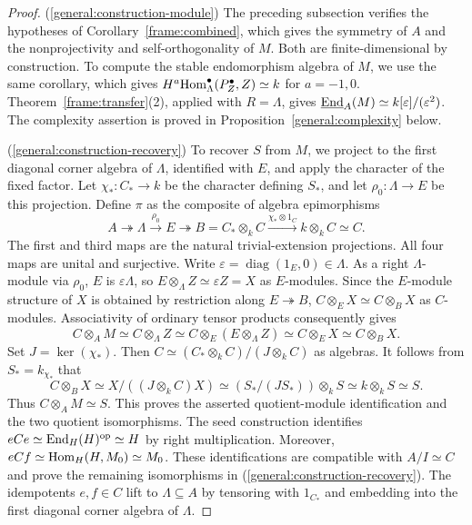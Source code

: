 \documentclass[11pt]{article}
\begin{document}
\begin{proof}
\textup{(\ref{general:construction-module})} The preceding subsection verifies the hypotheses of
Corollary~\ref{frame:combined}, which gives the symmetry of $A$
and the nonprojectivity and self-orthogonality of $M$.
Both are finite-dimensional by construction.
To compute the stable endomorphism algebra of $M$, we use the
same corollary, which gives
$H^a{\rm Hom}_\Lambda^\bullet(P_Z^\bullet,Z)\simeq k$ for $a=-1,0$.
Theorem~\ref{frame:transfer}\textup{(2)}, applied with $R=\Lambda$, gives
$\underline{{\rm End}}_A(M)\simeq k[\varepsilon]/(\varepsilon^2)$.
The complexity assertion is proved in Proposition~\ref{general:complexity}
below.

\textup{(\ref{general:construction-recovery})} To recover $S$ from $M$, we project to the first
diagonal corner algebra of $\Lambda$, identified with $E$, and apply
the character of the fixed factor. Let $\chi_*:C_*\to k$ be the
character defining $S_*$, and let $\rho_0:\Lambda\to E$ be this
projection.
Define $\pi$ as the composite of algebra epimorphisms
\begin{equation*}
 A\twoheadrightarrow\Lambda
 \xrightarrow{\rho_0} E
 \twoheadrightarrow B=C_*\otimes_k C
 \xrightarrow{\chi_*\otimes1_C} k\otimes_kC\simeq C.
\end{equation*}
The first and third maps are the natural trivial-extension
projections.  All four maps are unital and surjective.
Write $\varepsilon=\operatorname{diag}(1_E,0)\in\Lambda$.
As a right $\Lambda$-module via $\rho_0$, $E$ is $\varepsilon\Lambda$,
so $E\otimes_\Lambda Z\simeq\varepsilon Z=X$ as $E$-modules.
Since the $E$-module structure of $X$ is obtained by restriction along $E\twoheadrightarrow B$,
$C\otimes_E X\simeq C\otimes_B X$ as $C$-modules.
Associativity of ordinary tensor products consequently gives
$$
C\otimes_A M\simeq C\otimes_\Lambda Z\simeq C\otimes_E(E\otimes_\Lambda Z)
\simeq C\otimes_E X\simeq C\otimes_B X.
$$
Set $J=\ker(\chi_*)$. Then $C\simeq (C_*\otimes_k C)/(J\otimes_k C)$ as algebras. It follows from $S_*=k_{\chi_*}$ that
$$
C\otimes_B X\simeq X/((J\otimes_kC)X)\simeq (S_*/(JS_*))\otimes_kS\simeq k\otimes_kS\simeq S.
$$
Thus $C\otimes_A M\simeq S$. This proves the asserted quotient-module identification and the two
quotient isomorphisms. The seed construction identifies
$eCe\simeq{\rm End}_H(H)^{\mathrm{op}}\simeq H$ by right multiplication.
Moreover,  $eCf\simeq{\rm Hom}_H(H,M_0)\simeq M_0$.
These identifications are compatible with $A/I\simeq C$ and prove
the remaining isomorphisms in \textup{(\ref{general:construction-recovery})}. The idempotents $e,f\in C$ lift to
$\Lambda\subseteq A$ by tensoring with $1_{C_*}$ and embedding into the
first diagonal corner algebra of $\Lambda$.


\end{proof}
\end{document}
